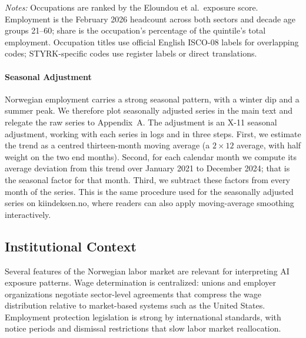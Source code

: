 \documentclass[12pt]{article}
\begin{document}
\begin{table}[htbp]
\centering
\caption{Five largest occupations by AI-exposure quintile, February 2026.}
\label{tab:quintile_top_occ}
\footnotesize

\begin{minipage}{\textwidth}\footnotesize\textit{Notes:} Occupations are ranked by the Eloundou et al.\ exposure score. Employment is the February 2026 headcount across both sectors and decade age groups 21--60; share is the occupation's percentage of the quintile's total employment. Occupation titles use official English ISCO-08 labels for overlapping codes; STYRK-specific codes use register labels or direct translations.\end{minipage}
\end{table}


\paragraph{Seasonal Adjustment}

Norwegian employment carries a strong seasonal pattern, with a winter dip and a summer peak. We therefore plot seasonally adjusted series in the main text and relegate the raw series to Appendix~A. The adjustment is an X-11 seasonal adjustment, working with each series in logs and in three steps. First, we estimate the trend as a centred thirteen-month moving average (a $2\times12$ average, with half weight on the two end months). Second, for each calendar month we compute its average deviation from this trend over January 2021 to December 2024; that is the seasonal factor for that month. Third, we subtract these factors from every month of the series. This is the same procedure used for the seasonally adjusted series on kiindeksen.no, where readers can also apply moving-average smoothing interactively.


\subsection{Institutional Context}\label{sec:data:institutions}

Several features of the Norwegian labor market are relevant for interpreting AI exposure patterns. Wage determination is centralized: unions and employer organizations negotiate sector-level agreements that compress the wage distribution relative to market-based systems such as the United States. Employment protection legislation is strong by international standards, with notice periods and dismissal restrictions that slow labor market reallocation.
\end{document}
